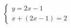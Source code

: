$\displaystyle
\left\{
\begin{array}{l}
\displaystyle y = 2x - 1 \\
\displaystyle x + (2x - 1) = 2
\end{array}
\right.
$
